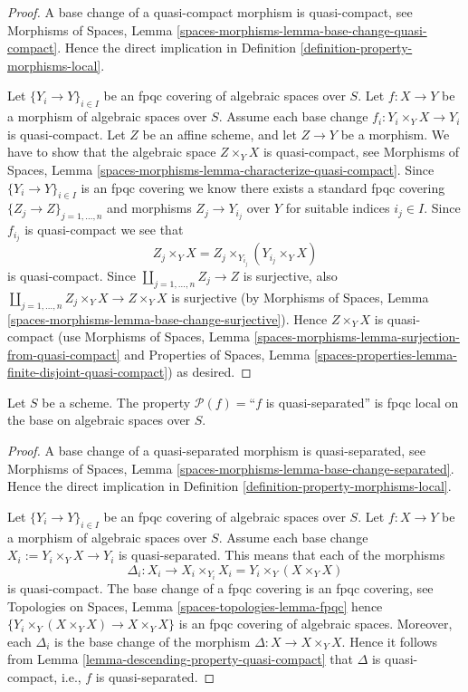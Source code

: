 \begin{proof}
A base change of a quasi-compact morphism is quasi-compact, see
Morphisms of Spaces,
Lemma \ref{spaces-morphisms-lemma-base-change-quasi-compact}.
Hence the direct implication in
Definition \ref{definition-property-morphisms-local}.

\medskip\noindent
Let $\{Y_i \to Y\}_{i \in I}$ be an fpqc covering of algebraic spaces over $S$.
Let $f : X \to Y$ be a morphism of algebraic spaces over $S$.
Assume each base change $f_i : Y_i \times_Y X \to Y_i$ is quasi-compact.
Let $Z$ be an affine scheme, and let $Z \to Y$ be a morphism.
We have to show that the algebraic space $Z \times_Y X$ is quasi-compact, see
Morphisms of Spaces,
Lemma \ref{spaces-morphisms-lemma-characterize-quasi-compact}.
Since $\{Y_i \to Y\}_{i \in I}$ is an fpqc covering we know there
exists a standard fpqc covering $\{Z_j \to Z\}_{j = 1, \ldots , n}$
and morphisms $Z_j \to Y_{i_j}$ over $Y$ for suitable indices $i_j \in I$.
Since $f_{i_j}$ is quasi-compact we see that
$$
Z_j \times_Y X
=
Z_j \times_{Y_{i_j}} (Y_{i_j} \times_Y X)
$$
is quasi-compact.
Since $\coprod_{j = 1, \ldots, n} Z_j \to Z$ is surjective,
also $\coprod_{j = 1, \ldots, n} Z_j \times_Y X \to Z \times_Y X$ is
surjective (by
Morphisms of Spaces,
Lemma \ref{spaces-morphisms-lemma-base-change-surjective}).
Hence $Z \times_Y X$ is quasi-compact (use
Morphisms of Spaces,
Lemma \ref{spaces-morphisms-lemma-surjection-from-quasi-compact}
and
Properties of Spaces,
Lemma \ref{spaces-properties-lemma-finite-disjoint-quasi-compact})
as desired.
\end{proof}

\begin{lemma}
\label{lemma-descending-property-quasi-separated}
Let $S$ be a scheme.
The property $\mathcal{P}(f) =$``$f$ is quasi-separated''
is fpqc local on the base on algebraic spaces over $S$.
\end{lemma}

\begin{proof}
A base change of a quasi-separated morphism is quasi-separated, see
Morphisms of Spaces,
Lemma \ref{spaces-morphisms-lemma-base-change-separated}.
Hence the direct implication in
Definition \ref{definition-property-morphisms-local}.

\medskip\noindent
Let $\{Y_i \to Y\}_{i \in I}$ be an fpqc covering of algebraic spaces over $S$.
Let $f : X \to Y$ be a morphism of algebraic spaces over $S$.
Assume each base change $X_i := Y_i \times_Y X \to Y_i$ is quasi-separated.
This means that each of the morphisms
$$
\Delta_i :
X_i
\longrightarrow
X_i \times_{Y_i} X_i = Y_i \times_Y (X \times_Y X)
$$
is quasi-compact. The base change of a fpqc covering is an fpqc covering, see
Topologies on Spaces, Lemma \ref{spaces-topologies-lemma-fpqc}
hence $\{Y_i \times_Y (X \times_Y X) \to X \times_Y X\}$
is an fpqc covering of algebraic spaces. Moreover, each
$\Delta_i$ is the base change of the morphism
$\Delta : X \to X \times_Y X$. Hence it follows from
Lemma \ref{lemma-descending-property-quasi-compact}
that $\Delta$ is quasi-compact, i.e., $f$ is quasi-separated.
\end{proof}

